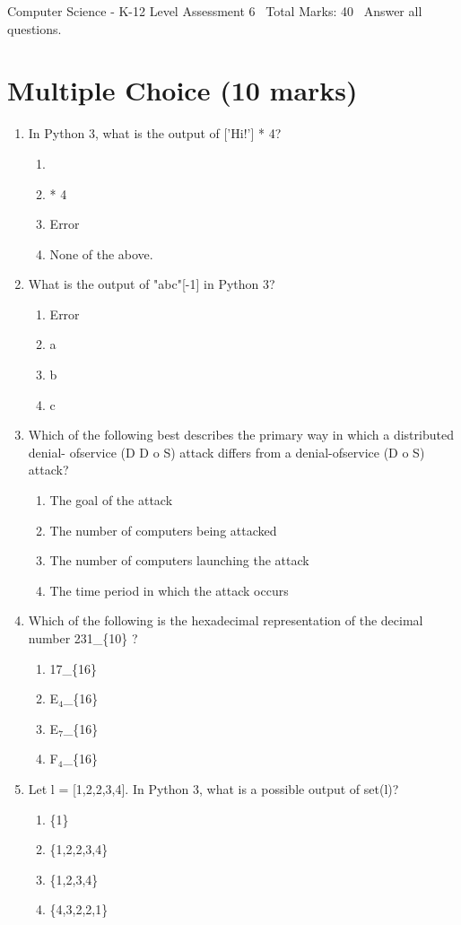 \documentclass[12pt]{article}
\begin{document}
\begin{center}
Computer Science - K-12 Level Assessment 6 \
Total Marks: 40 \
Answer all questions.
\end{center}

\section*{Multiple Choice (10 marks)}
\begin{enumerate}[label=\arabic*.]
\item In Python 3, what is the output of ['Hi!'] * 4?
\begin{enumerate}[label=(\alph*)]
    \item ['Hi!', 'Hi!', 'Hi!', 'Hi!']
    \item ['Hi!'] * 4
    \item Error
    \item None of the above.
\end{enumerate}
\item What is the output of "abc"[-1] in Python 3?
\begin{enumerate}[label=(\alph*)]
    \item Error
    \item a
    \item b
    \item c
\end{enumerate}
\item Which of the following best describes the primary way in which a distributed denial- ofservice (D D o S) attack differs from a denial-ofservice (D o S) attack?
\begin{enumerate}[label=(\alph*)]
    \item The goal of the attack
    \item The number of computers being attacked
    \item The number of computers launching the attack
    \item The time period in which the attack occurs
\end{enumerate}
\item Which of the following is the hexadecimal representation of the decimal number 231\_\{10\} ?
\begin{enumerate}[label=(\alph*)]
    \item 17\_\{16\}
    \item E$_{4}$\_\{16\}
    \item E$_{7}$\_\{16\}
    \item F$_{4}$\_\{16\}
\end{enumerate}
\item Let l = [1,2,2,3,4]. In Python 3, what is a possible output of set(l)?
\begin{enumerate}[label=(\alph*)]
    \item \{1\}
    \item \{1,2,2,3,4\}
    \item \{1,2,3,4\}
    \item \{4,3,2,2,1\}
\end{enumerate}
\end{enumerate}
\end{document}
